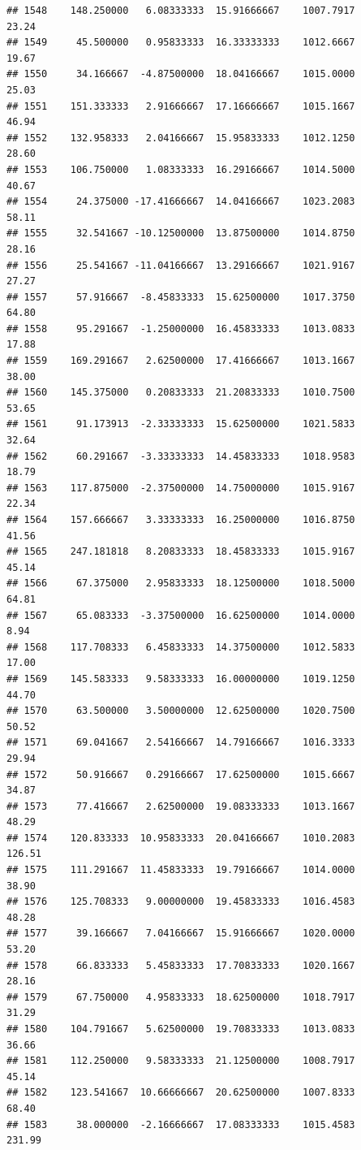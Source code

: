 \documentclass[
]{article}
\begin{document}
\begin{verbatim}
## 1548    148.250000   6.08333333  15.91666667    1007.7917       23.24
## 1549     45.500000   0.95833333  16.33333333    1012.6667       19.67
## 1550     34.166667  -4.87500000  18.04166667    1015.0000       25.03
## 1551    151.333333   2.91666667  17.16666667    1015.1667       46.94
## 1552    132.958333   2.04166667  15.95833333    1012.1250       28.60
## 1553    106.750000   1.08333333  16.29166667    1014.5000       40.67
## 1554     24.375000 -17.41666667  14.04166667    1023.2083       58.11
## 1555     32.541667 -10.12500000  13.87500000    1014.8750       28.16
## 1556     25.541667 -11.04166667  13.29166667    1021.9167       27.27
## 1557     57.916667  -8.45833333  15.62500000    1017.3750       64.80
## 1558     95.291667  -1.25000000  16.45833333    1013.0833       17.88
## 1559    169.291667   2.62500000  17.41666667    1013.1667       38.00
## 1560    145.375000   0.20833333  21.20833333    1010.7500       53.65
## 1561     91.173913  -2.33333333  15.62500000    1021.5833       32.64
## 1562     60.291667  -3.33333333  14.45833333    1018.9583       18.79
## 1563    117.875000  -2.37500000  14.75000000    1015.9167       22.34
## 1564    157.666667   3.33333333  16.25000000    1016.8750       41.56
## 1565    247.181818   8.20833333  18.45833333    1015.9167       45.14
## 1566     67.375000   2.95833333  18.12500000    1018.5000       64.81
## 1567     65.083333  -3.37500000  16.62500000    1014.0000        8.94
## 1568    117.708333   6.45833333  14.37500000    1012.5833       17.00
## 1569    145.583333   9.58333333  16.00000000    1019.1250       44.70
## 1570     63.500000   3.50000000  12.62500000    1020.7500       50.52
## 1571     69.041667   2.54166667  14.79166667    1016.3333       29.94
## 1572     50.916667   0.29166667  17.62500000    1015.6667       34.87
## 1573     77.416667   2.62500000  19.08333333    1013.1667       48.29
## 1574    120.833333  10.95833333  20.04166667    1010.2083      126.51
## 1575    111.291667  11.45833333  19.79166667    1014.0000       38.90
## 1576    125.708333   9.00000000  19.45833333    1016.4583       48.28
## 1577     39.166667   7.04166667  15.91666667    1020.0000       53.20
## 1578     66.833333   5.45833333  17.70833333    1020.1667       28.16
## 1579     67.750000   4.95833333  18.62500000    1018.7917       31.29
## 1580    104.791667   5.62500000  19.70833333    1013.0833       36.66
## 1581    112.250000   9.58333333  21.12500000    1008.7917       45.14
## 1582    123.541667  10.66666667  20.62500000    1007.8333       68.40
## 1583     38.000000  -2.16666667  17.08333333    1015.4583      231.99

\end{verbatim}
\end{document}
